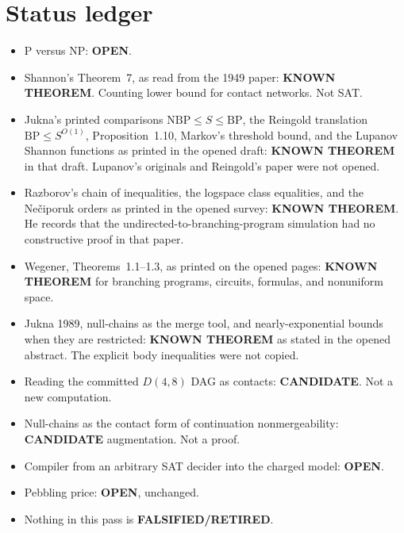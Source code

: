 \documentclass[11pt]{article}
\begin{document}
\section{Status ledger}
\begin{itemize}
\item P versus NP: \textbf{OPEN}.
\item Shannon's Theorem~7, as read from the 1949 paper: \textbf{KNOWN THEOREM}. Counting lower bound for contact networks. Not SAT.
\item Jukna's printed comparisons \(\mathrm{NBP}\le S\le\mathrm{BP}\), the Reingold translation \(\mathrm{BP}\le S^{O(1)}\), Proposition~1.10, Markov's threshold bound, and the Lupanov Shannon functions as printed in the opened draft: \textbf{KNOWN THEOREM} in that draft. Lupanov's originals and Reingold's paper were not opened.
\item Razborov's chain of inequalities, the logspace class equalities, and the Ne\v{c}iporuk orders as printed in the opened survey: \textbf{KNOWN THEOREM}. He records that the undirected-to-branching-program simulation had no constructive proof in that paper.
\item Wegener, Theorems~1.1--1.3, as printed on the opened pages: \textbf{KNOWN THEOREM} for branching programs, circuits, formulas, and nonuniform space.
\item Jukna 1989, null-chains as the merge tool, and nearly-exponential bounds when they are restricted: \textbf{KNOWN THEOREM} as stated in the opened abstract. The explicit body inequalities were not copied.
\item Reading the committed \(D(4,8)\) DAG as contacts: \textbf{CANDIDATE}. Not a new computation.
\item Null-chains as the contact form of continuation nonmergeability: \textbf{CANDIDATE} augmentation. Not a proof.
\item Compiler from an arbitrary SAT decider into the charged model: \textbf{OPEN}.
\item Pebbling price: \textbf{OPEN}, unchanged.
\item Nothing in this pass is \textbf{FALSIFIED/RETIRED}.
\end{itemize}

\end{document}

